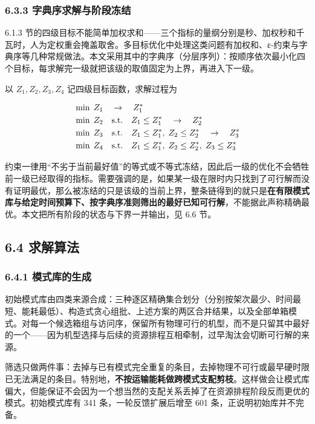 \documentclass[withoutpreface,bwprint]{format}
\begin{document}
\subsubsection{6.3.3 字典序求解与阶段冻结}
6.1.3 节的四级目标不能简单加权求和——三个指标的量纲分别是秒、加权秒和千瓦时，人为定权重会掩盖取舍。多目标优化中处理这类问题有加权和、ε-约束与字典序等几种常规做法\cite{ehrgott2005}。本文采用其中的字典序（分层序列）：按顺序依次最小化四个目标，每求解完一级就把该级的取值固定为上界，再进入下一级。

以 $Z_1, Z_2, Z_3, Z_4$ 记四级目标函数，求解过程为

\begin{align}
& \min\; Z_1 \quad \to \quad Z_1^{\ast} \notag \\
& \min\; Z_2 \quad \text{s.t.} \quad Z_1 \le Z_1^{\ast} \quad \to \quad Z_2^{\ast} \notag \\
& \min\; Z_3 \quad \text{s.t.} \quad Z_1 \le Z_1^{\ast},\; Z_2 \le Z_2^{\ast} \quad \to \quad Z_3^{\ast} \notag \\
& \min\; Z_4 \quad \text{s.t.} \quad Z_1 \le Z_1^{\ast},\; Z_2 \le Z_2^{\ast},\; Z_3 \le Z_3^{\ast}
\end{align}

约束一律用“不劣于当前最好值”的等式或不等式冻结，因此后一级的优化不会牺牲前一级已经取得的指标。需要强调的是，如果某一级在限时内只找到了可行解而没有证明最优，那么被冻结的只是该级的当前上界，整条链得到的就只是\textbf{在有限模式库与给定时间预算下、按字典序准则筛出的最好已知可行解}，不能据此声称精确最优。本文把所有阶段的状态与下界一并输出，见 6.6 节。

\subsection{6.4 求解算法}

\subsubsection{6.4.1 模式库的生成}
初始模式库由四类来源合成：三种逐区精确集合划分（分别按架次最少、时间最短、能耗最低）、构造式贪心组批、上述方案的两区合并结果，以及全部单箱模式。对每一个候选箱组与访问序，保留所有物理可行的机型，而不是只留其中最好的一个——因为机型选择与后续的资源排程互相牵制，过早淘汰会切断可行解的来源。

筛选只做两件事：去掉与已有模式完全重复的条目，去掉物理不可行或最早硬时限已无法满足的条目。特别地，\textbf{不按运输能耗做跨模式支配剪枝}。这样做会让模式库偏大，但能保证不会因为一个想当然的支配关系丢掉了在资源排程阶段反而更优的模式。初始模式库有 341 条，一轮反馈扩展后增至 601 条，正说明初始库并不完备。
\end{document}
